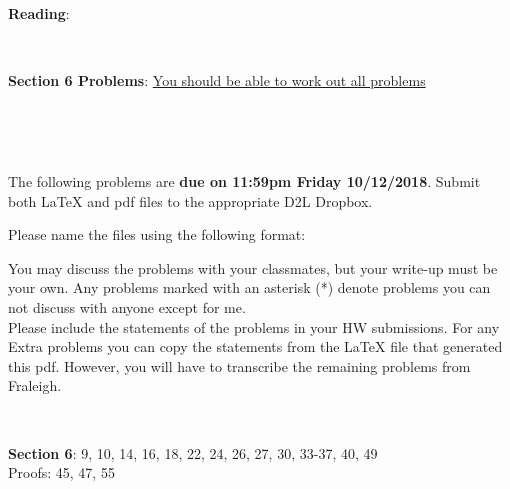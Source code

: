 \documentclass[12pt]{article}
\begin{document}
{\bf Reading}: 

\

{\bf Section 6 Problems}: \underline{You should be able to work out all problems}

\


\hrulefill

\

The following problems are {\bf due on 11:59pm Friday 10/12/2018}.  Submit both LaTeX and pdf files to the appropriate D2L Dropbox. 

Please name the files using the following format:
\begin{center}
\end{center}

You may discuss the problems with your classmates, but your write-up must be your own.  Any problems marked with an asterisk (*) denote problems you can not discuss with anyone except for me.\\

Please include the statements of the problems in your HW submissions. For any Extra problems you can copy the statements from the LaTeX file that generated this pdf. However, you will have to transcribe the remaining problems from Fraleigh.

\

\textbf{Section 6}: 9, 10, 14, 16, 18, 22, 24, 26, 27, 30, 33-37, 40, 49\\
Proofs: 45, 47, 55
\end{document}
